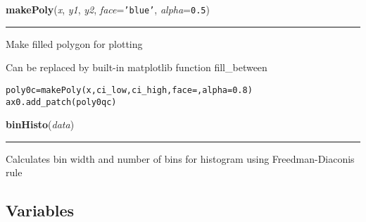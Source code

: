 \hspace{.8\funcindent}\begin{boxedminipage}{\funcwidth}

    \raggedright \textbf{makePoly}(\textit{x}, \textit{y1}, \textit{y2}, \textit{face}={\tt \texttt{'}\texttt{blue}\texttt{'}}, \textit{alpha}={\tt 0.5})

    \vspace{-1.5ex}

    \rule{\textwidth}{0.5\fboxrule}
\setlength{\parskip}{2ex}
    Make filled polygon for plotting

    Can be replaced by built-in matplotlib function fill\_between

\begin{alltt}
\pysrcprompt{{\textgreater}{\textgreater}{\textgreater} }poly0c = makePoly(x, ci\_low, ci\_high, face=, alpha=0.8)
\pysrcprompt{{\textgreater}{\textgreater}{\textgreater} }ax0.add\_patch(poly0qc)\end{alltt}
\setlength{\parskip}{1ex}
    \end{boxedminipage}

    \label{spacepy:utils:binHisto}

    \vspace{0.5ex}

\hspace{.8\funcindent}\begin{boxedminipage}{\funcwidth}

    \raggedright \textbf{binHisto}(\textit{data})

    \vspace{-1.5ex}

    \rule{\textwidth}{0.5\fboxrule}
\setlength{\parskip}{2ex}
    Calculates bin width and number of bins for histogram using 
    Freedman-Diaconis rule

\setlength{\parskip}{1ex}
    \end{boxedminipage}



  \subsection{Variables}

